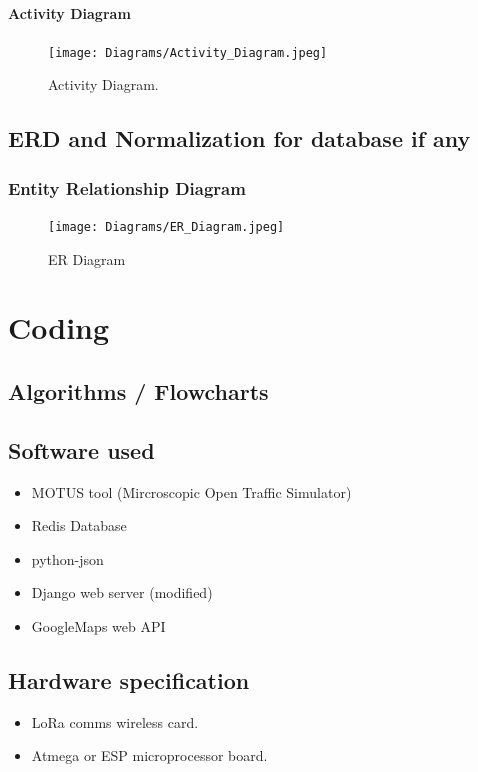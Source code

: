 \documentclass[twoside,a4paper,12pt]{book}
\begin{document}
\subsubsection{Activity Diagram}
	\begin{figure}[!h]
		\begin{center}
			\texttt{[image: Diagrams/Activity\_Diagram.jpeg]}
		\end{center}
		\caption{Activity Diagram.}
	\end{figure}


\newpage
\section{ERD and Normalization for database if any}
\subsection{Entity Relationship Diagram}
	\begin{figure}[!ht]
		\begin{center}
			\texttt{[image: Diagrams/ER\_Diagram.jpeg]}
		\end{center}
		\caption{ER Diagram}
	\end{figure}


\chapter{Coding}

\section{Algorithms / Flowcharts}
\section{Software used}
\begin{itemize}
    \item MOTUS tool (Mircroscopic Open Traffic Simulator)
    \item Redis Database
    \item python-json
    \item Django web server (modified)
    \item GoogleMaps web API
\end{itemize}

\section{Hardware specification}
\begin{itemize}
    \item LoRa comms wireless card.
    \item Atmega or ESP microprocessor board.
\end{itemize}
\end{document}
